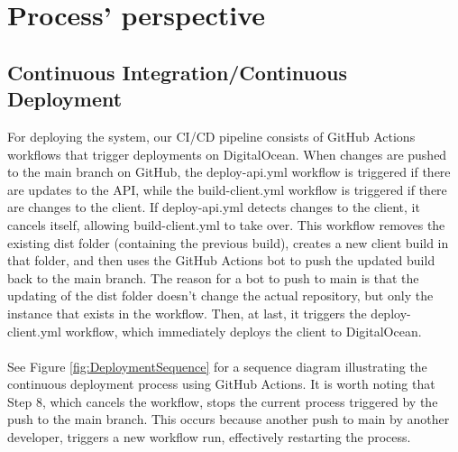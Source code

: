 \section{Process' perspective}

\subsection{Continuous Integration/Continuous Deployment}
For deploying the system, our CI/CD pipeline consists of GitHub Actions workflows that trigger deployments on DigitalOcean. When changes are pushed to the main branch on GitHub, the deploy-api.yml workflow is triggered if there are updates to the API, while the build-client.yml workflow is triggered if there are changes to the client. If deploy-api.yml detects changes to the client, it cancels itself, allowing build-client.yml to take over. This workflow removes the existing dist folder (containing the previous build), creates a new client build in that folder, and then uses the GitHub Actions bot to push the updated build back to the main branch. The reason for a bot to push to main is that the updating of the dist folder doesn't change the actual repository, but only the instance that exists in the workflow. Then, at last, it triggers the deploy-client.yml workflow, which immediately deploys the client to DigitalOcean.
\\\\
See Figure \ref{fig:DeploymentSequence} for a sequence diagram illustrating the continuous deployment process using GitHub Actions. It is worth noting that Step 8, which cancels the workflow, stops the current process triggered by the push to the main branch. This occurs because another push to main by another developer, triggers a new workflow run, effectively restarting the process.

